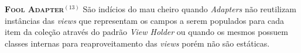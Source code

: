 

  \noindent
  \textsc{\textbf{{\small Fool Adapter}}}$^{(13)}$ São indícios do mau cheiro quando \textit{Adapters} não reutilizam instâncias das \textit{views} que representam os campos a serem populados para cada item da coleção através do padrão \textit{View Holder} ou quando os mesmos possuem classes internas para reaproveitamento das \textit{views} porém não são estáticas.






